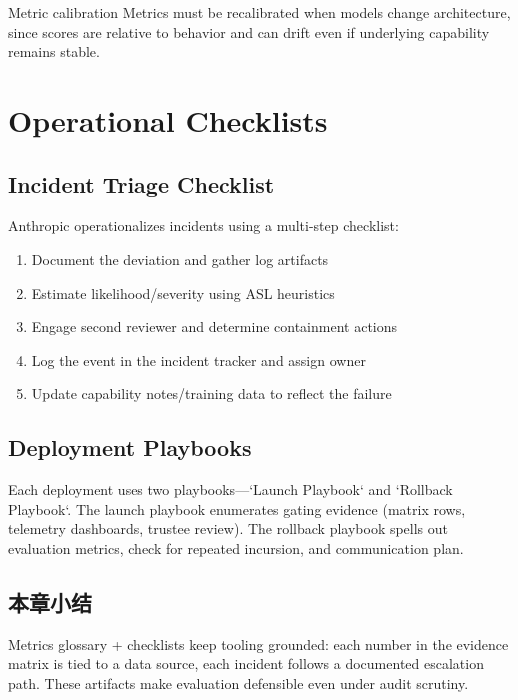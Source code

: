 \documentclass[a4paper]{article}
\begin{document}
\begin{warningbox}{Metric calibration}
Metrics must be recalibrated when models change architecture, since scores are relative to behavior and can drift even if underlying capability remains stable.
\end{warningbox}

\section{Operational Checklists}

\subsection{Incident Triage Checklist}

Anthropic operationalizes incidents using a multi-step checklist:

\begin{enumerate}
    \item Document the deviation and gather log artifacts
    \item Estimate likelihood/severity using ASL heuristics
    \item Engage second reviewer and determine containment actions
    \item Log the event in the incident tracker and assign owner
    \item Update capability notes/training data to reflect the failure
\end{enumerate}

\subsection{Deployment Playbooks}

Each deployment uses two playbooks—`Launch Playbook` and `Rollback Playbook`. The launch playbook enumerates gating evidence (matrix rows, telemetry dashboards, trustee review). The rollback playbook spells out evaluation metrics, check for repeated incursion, and communication plan.

\subsection{本章小结}

Metrics glossary + checklists keep tooling grounded: each number in the evidence matrix is tied to a data source, each incident follows a documented escalation path. These artifacts make evaluation defensible even under audit scrutiny.
\end{document}
